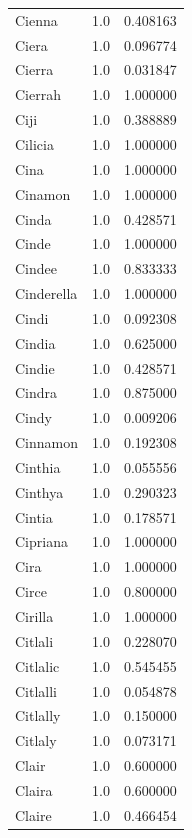 \documentclass[
  letterpaper,
  DIV=11,
  numbers=noendperiod]{scrreprt}
\begin{document}
\begin{tabular}{lrr}
Cienna          &   1.0 &   0.408163 \\
Ciera           &   1.0 &   0.096774 \\
Cierra          &   1.0 &   0.031847 \\
Cierrah         &   1.0 &   1.000000 \\
Ciji            &   1.0 &   0.388889 \\
Cilicia         &   1.0 &   1.000000 \\
Cina            &   1.0 &   1.000000 \\
Cinamon         &   1.0 &   1.000000 \\
Cinda           &   1.0 &   0.428571 \\
Cinde           &   1.0 &   1.000000 \\
Cindee          &   1.0 &   0.833333 \\
Cinderella      &   1.0 &   1.000000 \\
Cindi           &   1.0 &   0.092308 \\
Cindia          &   1.0 &   0.625000 \\
Cindie          &   1.0 &   0.428571 \\
Cindra          &   1.0 &   0.875000 \\
Cindy           &   1.0 &   0.009206 \\
Cinnamon        &   1.0 &   0.192308 \\
Cinthia         &   1.0 &   0.055556 \\
Cinthya         &   1.0 &   0.290323 \\
Cintia          &   1.0 &   0.178571 \\
Cipriana        &   1.0 &   1.000000 \\
Cira            &   1.0 &   1.000000 \\
Circe           &   1.0 &   0.800000 \\
Cirilla         &   1.0 &   1.000000 \\
Citlali         &   1.0 &   0.228070 \\
Citlalic        &   1.0 &   0.545455 \\
Citlalli        &   1.0 &   0.054878 \\
Citlally        &   1.0 &   0.150000 \\
Citlaly         &   1.0 &   0.073171 \\
Clair           &   1.0 &   0.600000 \\
Claira          &   1.0 &   0.600000 \\
Claire          &   1.0 &   0.466454 \\

\end{tabular}
\end{document}
